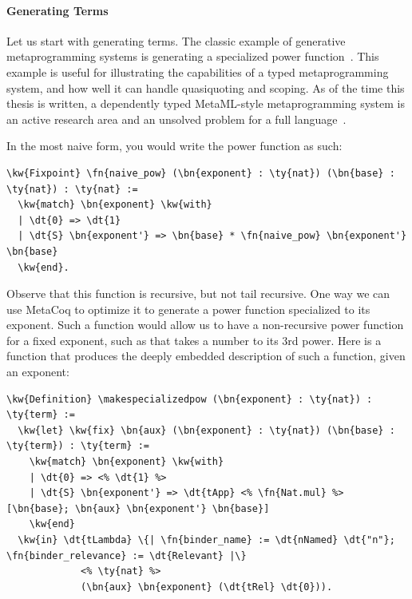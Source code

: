 \paragraph*{Generating Terms}

Let us start with generating terms. The classic example of generative \gls{metaprogramming} systems is generating a specialized power function~\cite{sheard2001, taha2004, coutts2004, rompf2012, stucki2018}. This example is useful for illustrating the capabilities of a typed \gls{metaprogramming} system, and how well it can handle quasiquoting and scoping. As of the time this thesis is written, a dependently typed MetaML-style \gls{metaprogramming} system is an active research area and an unsolved problem for a full language~\cite{kawata2019dependently, xie2022staging}.


In the most naive form, you would write the power function as such:
\begin{Verbatim}
\kw{Fixpoint} \fn{naive_pow} (\bn{exponent} : \ty{nat}) (\bn{base} : \ty{nat}) : \ty{nat} :=
  \kw{match} \bn{exponent} \kw{with}
  | \dt{0} => \dt{1}
  | \dt{S} \bn{exponent'} => \bn{base} * \fn{naive_pow} \bn{exponent'} \bn{base}
  \kw{end}.
\end{Verbatim}

Observe that this function is recursive, but not tail recursive. One way we can use MetaCoq to optimize it to generate a power function specialized to its exponent. Such a function would allow us to have a non-recursive power function for a fixed exponent, such as \linebreak{} that takes a number to its 3rd power. Here is a function that produces the deeply embedded description of such a function, given an exponent:

\newcommand{\makespecializedpow}{\hyperref[code:makespecializedpow]{\fn{make\_specialized\_pow}}}
\label{code:makespecializedpow}
\begin{Verbatim}
\kw{Definition} \makespecializedpow (\bn{exponent} : \ty{nat}) : \ty{term} :=
  \kw{let} \kw{fix} \bn{aux} (\bn{exponent} : \ty{nat}) (\bn{base} : \ty{term}) : \ty{term} :=
    \kw{match} \bn{exponent} \kw{with}
    | \dt{0} => <% \dt{1} %>
    | \dt{S} \bn{exponent'} => \dt{tApp} <% \fn{Nat.mul} %> [\bn{base}; \bn{aux} \bn{exponent'} \bn{base}]
    \kw{end}
  \kw{in} \dt{tLambda} \{| \fn{binder_name} := \dt{nNamed} \dt{"n"}; \fn{binder_relevance} := \dt{Relevant} |\}
             <% \ty{nat} %>
             (\bn{aux} \bn{exponent} (\dt{tRel} \dt{0})).
\end{Verbatim}



